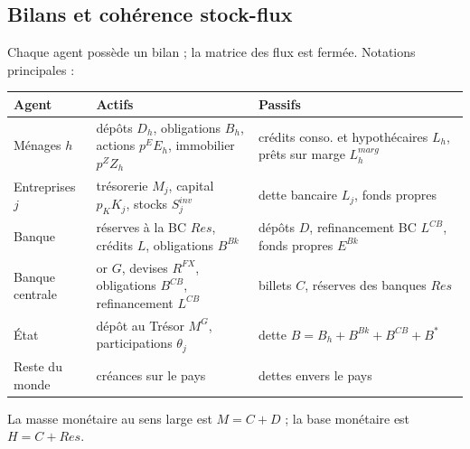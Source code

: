 \documentclass[11pt,a4paper]{article}
\begin{document}
\subsection{Bilans et cohérence stock-flux}
Chaque agent possède un bilan ; la matrice des flux est fermée. Notations principales :
\begin{center}\small
\begin{tabular}{p{2.6cm}p{6.6cm}p{5.6cm}}
\toprule
\textbf{Agent} & \textbf{Actifs} & \textbf{Passifs}\\
\midrule
Ménages $h$ & dépôts $D_h$, obligations $B_h$, actions $p^E E_h$, immobilier $p^Z Z_h$ & crédits conso. et hypothécaires $L_h$, prêts sur marge $L^{marg}_h$\\
Entreprises $j$ & trésorerie $M_j$, capital $p_K K_j$, stocks $S^{inv}_j$ & dette bancaire $L_j$, fonds propres\\
Banque & réserves à la BC $Res$, crédits $L$, obligations $B^{Bk}$ & dépôts $D$, refinancement BC $L^{CB}$, fonds propres $E^{Bk}$\\
Banque centrale & or $G$, devises $R^{FX}$, obligations $B^{CB}$, refinancement $L^{CB}$ & billets $C$, réserves des banques $Res$\\
État & dépôt au Trésor $M^G$, participations $\theta_j$ & dette $B = B_h + B^{Bk} + B^{CB} + B^{\ast}$\\
Reste du monde & créances sur le pays & dettes envers le pays\\
\bottomrule
\end{tabular}
\end{center}
La masse monétaire au sens large est $M = C + D$ ; la base monétaire est $H = C + Res$.
\end{document}
